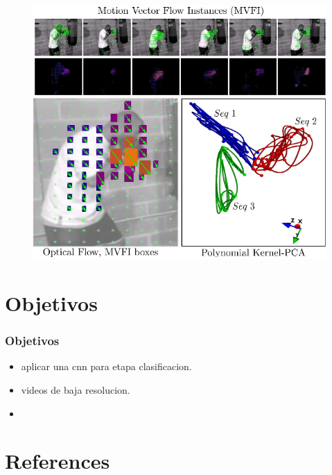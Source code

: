 \documentclass{beamer}
\begin{document}
\begin{frame}
\begin{figure}
 \includegraphics[width=0.8\linewidth]{img2/6-Figure2-1.png} 
\end{figure}
\end{frame}
 
 



\section{Objetivos}

\begin{frame}
\frametitle{Objetivos}
\begin{itemize}
\item aplicar una cnn para etapa clasificacion.
\item videos de baja resolucion. 
\item  
\end{itemize}
\end{frame}

\section{References}
\end{document}
